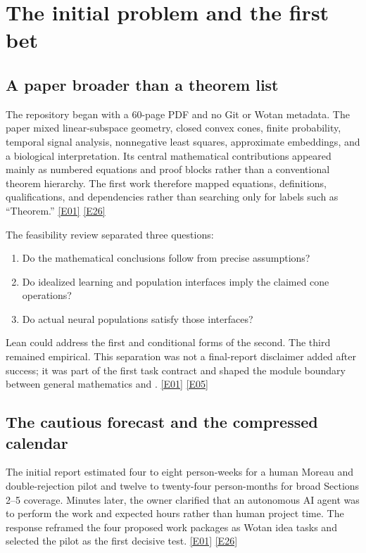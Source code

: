 \documentclass[11pt,a4paper]{article}
\newcommand{\artifact}[1]{\texttt{\detokenize{#1}}}
\newcommand{\ev}[1]{%
  \hyperref[ev:#1]{\textcolor{ReportBlue}{\textsf{\scriptsize[#1]}}}}
\begin{document}
\section{The initial problem and the first bet}
\label{sec:initial}

\subsection{A paper broader than a theorem list}

The repository began with a 60-page PDF and no Git or Wotan metadata. The paper mixed
linear-subspace geometry, closed convex cones, finite probability, temporal signal
analysis, nonnegative least squares, approximate embeddings, and a biological
interpretation. Its central mathematical contributions appeared mainly as numbered
equations and proof blocks rather than a conventional theorem hierarchy. The first
work therefore mapped equations, definitions, qualifications, and dependencies
rather than searching only for labels such as ``Theorem.'' \ev{E01}\ev{E26}

The feasibility review separated three questions:

\begin{enumerate}[label=\arabic*.]
  \item Do the mathematical conclusions follow from precise assumptions?
  \item Do idealized learning and population interfaces imply the claimed cone
    operations?
  \item Do actual neural populations satisfy those interfaces?
\end{enumerate}

Lean could address the first and conditional forms of the second. The third remained
empirical. This separation was not a final-report disclaimer added after success; it
was part of the first task contract and shaped the module boundary between general
mathematics and \artifact{Model/Population.lean}. \ev{E01}\ev{E05}

\subsection{The cautious forecast and the compressed calendar}

The initial report estimated four to eight person-weeks for a human Moreau and
double-rejection pilot and twelve to twenty-four person-months for broad Sections
2--5 coverage. Minutes later, the owner clarified that an autonomous AI agent was to
perform the work and expected hours rather than human project time. The response
reframed the four proposed work packages as Wotan idea tasks and selected the pilot
as the first decisive test. \ev{E01}\ev{E26}
\end{document}
